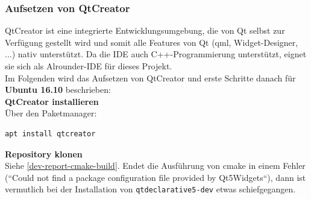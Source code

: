 \subsubsection{Aufsetzen von QtCreator}

QtCreator ist eine integrierte Entwicklungsumgebung, die von Qt selbst zur Verfügung gestellt wird und somit alle Features von Qt (qml, Widget-Designer, ...) nativ unterstützt. Da die IDE auch C++-Programmierung unterstützt, eignet sie sich als Alrounder-IDE für dieses Projekt.\\

Im Folgenden wird das Aufsetzen von QtCreator und erste Schritte danach für \textbf{Ubuntu 16.10} beschrieben:\\

\textbf{QtCreator installieren}\\
Über den Paketmanager:
\begin{lstlisting}
apt install qtcreator
\end{lstlisting}

\textbf{Repository klonen}\\
Siehe \autoref{dev-report-cmake-build}. Endet die Ausführung von cmake in einem Fehler (``Could not find a package configuration file provided by Qt5Widgets``), dann ist vermutlich bei der Installation von \texttt{qtdeclarative5-dev} etwas schiefgegangen.\\

